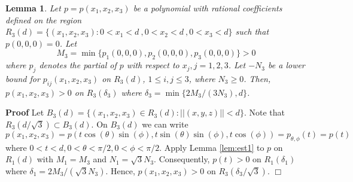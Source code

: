 \documentclass[12pt]{article}
\newtheorem{lemma}[theorem]{Lemma}
\begin{document}
\begin{lemma} \label{lem:est3}
Let $p = p(x_1,x_2,x_3)$ be a polynomial with rational coefficients defined on the region $R_3(d) = \{ (x_1,x_2,x_3) : 0 < x_1 < d\ , 0 < x_2 < d\ ,0 < x_3 < d\}$ such that $p(0,0,0) = 0$.  
Let 
$$M_3 = \min\{p_1(0,0,0), p_2(0,0,0), p_3(0,0,0)\} > 0$$
where $p_j$ denotes the partial of $p$ with respect to $x_j, j = 1, 2, 3$.  
Let $-N_3$ be a lower bound for $p_{ij}(x_1,x_2,x_3)$ on $R_3(d)$, $ 1 \le i,j \le 3$,  where $N_3 \ge 0$.  Then,
$p(x_1,x_2,x_3) > 0$ on $R_3(\delta_3)$ where $\delta_3 = \min\{2 M_3/(3N_3),d\}$.
\end{lemma}
\textbf{Proof}
Let $B_3(d) = \{(x_1,x_2,x_3) \in R_3(d) : ||(x,y,z)|| < d\}$.  Note that $R_3(d/\sqrt{3}) \subset B_3(d)$.  On $B_3(d)$ we can write 
$$p(x_1,x_2,x_3) = p(t\cos(\theta)\sin(\phi),t\sin(\theta)\sin(\phi),t\cos(\phi)) = p_{\theta,\phi}(t) = p(t)$$ 
where $0 < t < d, 0 < \theta < \pi/2, 0 < \phi < \pi/2$.  Apply Lemma \ref{lem:est1} to $p$ on $R_1(d)$ with $M_1 = M_3$ and $N_1 = \sqrt{3}N_3$. Consequently, $p(t) > 0$ on $R_1(\delta_1)$ where $\delta_1 = 2M_3/(\sqrt{3} N_3)$.  Hence, $p(x_1,x_2,x_3) > 0$ on $R_3(\delta_3/\sqrt{3})$. $\Box$

\vspace{0.05in}


% 

\def\cprime{$'$}
\providecommand{\bysame}{\leavevmode\hbox to3em{\hrulefill}\thinspace}
\providecommand{\MR}{\relax\ifhmode\unskip\space\fi MR }
\providecommand{\MRhref}[2]{%
  \href{http://www.ams.org/mathscinet-getitem?mr=#1}{#2}
}
\providecommand{\href}[2]{#2}
\end{document}
